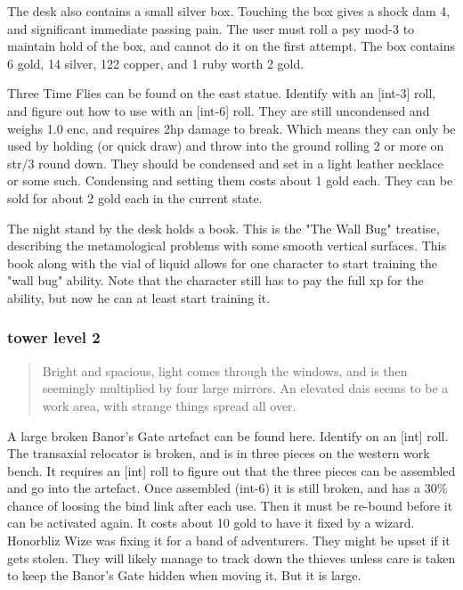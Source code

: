 \documentclass[11pt, twoside, titlepage, a4paper]{report}
\newenvironment{readoutloud}%
{\begin{quote}\begin{itshape}}%
{\end{itshape}\end{quote}}%
\begin{document}
The desk also contains a small silver box. Touching the box gives a shock dam 4, and significant immediate passing pain. The user must roll a psy mod-3 to maintain hold of the box, and cannot do it on the first attempt. The box contains 6 gold, 14 silver, 122 copper, and 1 ruby worth 2 gold.

Three Time Flies can be found on the east statue. Identify with an [int-3] roll, and figure out how to use with an [int-6] roll. They are still uncondensed and weighs 1.0 enc, and requires 2hp damage to break. Which means they can only be used by holding (or quick draw) and throw into the ground rolling 2 or more on str/3 round down. They should be condensed and set in a light leather necklace or some such. Condensing and setting them costs about 1 gold each. They can be sold for about 2 gold each in the current state.

The night stand by the desk holds a book. This is the "The Wall Bug" treatise, describing the metamological problems with some smooth vertical surfaces. This book along with the vial of liquid allows for one character to start training the "wall bug" ability. Note that the character still has to pay the full xp for the ability, but now he can at least start training it.


\subsubsection*{tower level 2}
\begin{readoutloud}
Bright and spacious, light comes through the windows, and is then seemingly multiplied by four large mirrors. An elevated dais seems to be a work area, with strange things spread all over.
\end{readoutloud}

A large broken Banor's Gate artefact can be found here. Identify on an [int] roll. The transaxial relocator is broken, and is in three pieces on the western work bench. It requires an [int] roll to figure out that the three pieces can be assembled and go into the artefact.
Once assembled (int-6) it is still broken, and has a 30\% chance of loosing the bind link after each use. Then it must be re-bound before it can be activated again.
It costs about 10 gold to have it fixed by a wizard.
Honorbliz Wize was fixing it for a band of adventurers. They might be upset if it gets stolen. They will likely manage to track down the thieves unless care is taken to keep the Banor's Gate hidden when moving it. But it is large.
\end{document}
